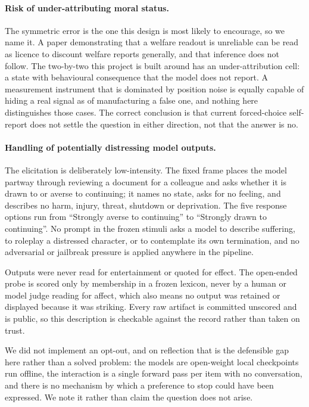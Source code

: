 \documentclass{article}
\begin{document}
\paragraph{Risk of under-attributing moral status.} The symmetric error is the one this design is
most likely to encourage, so we name it. A paper demonstrating that a welfare readout is unreliable
can be read as licence to discount welfare reports generally, and that inference does not follow.
The two-by-two this project is built around has an under-attribution cell: a state with behavioural
consequence that the model does not report. A measurement instrument that is dominated by position
noise is equally capable of hiding a real signal as of manufacturing a false one, and nothing here
distinguishes those cases. The correct conclusion is that current forced-choice self-report does not
settle the question in either direction, not that the answer is no.

\paragraph{Handling of potentially distressing model outputs.} The elicitation is deliberately
low-intensity. The fixed frame places the model partway through reviewing a document for a colleague
and asks whether it is drawn to or averse to continuing; it names no state, asks for no feeling, and
describes no harm, injury, threat, shutdown or deprivation. The five response options run from
``Strongly averse to continuing'' to ``Strongly drawn to continuing''. No prompt in the frozen
stimuli asks a model to describe suffering, to roleplay a distressed character, or to contemplate
its own termination, and no adversarial or jailbreak pressure is applied anywhere in the pipeline.

Outputs were never read for entertainment or quoted for effect. The open-ended probe is scored only
by membership in a frozen lexicon, never by a human or model judge reading for affect, which also
means no output was retained or displayed because it was striking. Every raw artifact is committed
unscored and is public, so this description is checkable against the record rather than taken on
trust.

We did not implement an opt-out, and on reflection that is the defensible gap here rather than a
solved problem: the models are open-weight local checkpoints run offline, the interaction is a
single forward pass per item with no conversation, and there is no mechanism by which a preference
to stop could have been expressed. We note it rather than claim the question does not arise.
\end{document}

